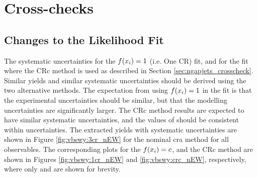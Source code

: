 %
%
\clearpage
\section{Cross-checks}\label{sec:vbswy:crosschecks}

\subsection{Changes to the Likelihood Fit}

The systematic uncertainties for the $f(x_i)=1$ (i.e. One CR) fit, and for the fit where the CRc method is used as described in Section \ref{sec:ngapjets_crosscheck}. Similar yields and similar systematic uncertainties should be derived using the two alternative methods. The expectation from using $f(x_i)=1$ in the fit is that the experimental uncertainties should be similar, but that the modelling uncertainties are significantly larger. The CRc method results are expected to have similar systematic uncertainties, and the values of \new should be consistent within uncertainties. %
The extracted yields with systematic uncertainties are shown in Figure \ref{fig:vbswy:3cr_nEW} for the nominal cra method for all observables. The corresponding plots for the $f(x_i)=c$, and the CRc method are shown in Figures \ref{fig:vbswy:1cr_nEW} and \ref{fig:vbswy:crc_nEW}, respectively, where only \mjj and \jjpt are shown for brevity.

